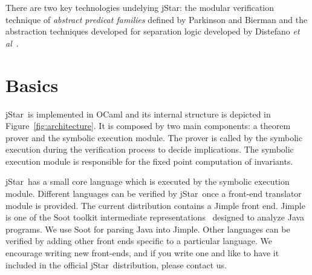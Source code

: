 \documentclass[11pt]{article}
\newcommand{\jStar}{{\sf jStar}}
\begin{document}
There are two key technologies undelying \jStar: the modular
verification technique of {\em abstract predicat families} defined by
Parkinson and Bierman \cite{Parkinson:popl05,PB:popl08} and the abstraction
techniques developed for separation logic developed by
Distefano {\em et al}~\cite{DOY:tacas06}.


\section{Basics}
\label{sec:basics}
\jStar \ is implemented in OCaml and its internal structure is depicted in
Figure~\ref{fig:architecture}.  It is composed by two main
components: a theorem prover and the symbolic execution module. The
prover is called by the symbolic execution during the verification
process to decide implications.  The symbolic execution module is
responsible for the fixed point computation of invariants.

\jStar \ has a small core language which is executed by the symbolic execution module.
Different languages can be verified by \jStar \ once a front-end translator module is provided.
The current distribution contains a Jimple front end.
Jimple is one of the Soot
toolkit intermediate representations~\cite{vall99soot} designed to
analyze Java programs. We use Soot for parsing Java into
Jimple. Other languages can be verified by adding other front ends specific to a particular language.
We encourage writing new front-ends, and if you write one and like to have it included in the official 
\jStar \ distribution, please contact us.
\end{document}

